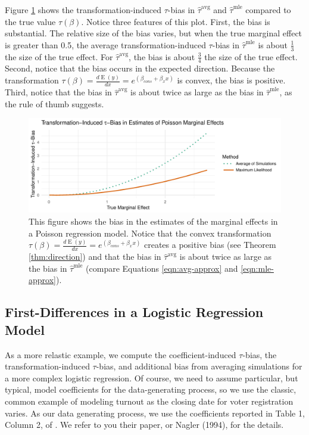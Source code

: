 \documentclass[11pt]{article}
\DeclareMathOperator*{\E}{\text{E}}
\begin{document}
Figure \ref{fig:poisson-mcs} shows the transformation-induced $\tau$-bias in $\hat{\tau}^\text{avg}$ and $\hat{\tau}^\text{mle}$ compared to the true value $\tau(\beta)$.
Notice three features of this plot.
First, the bias is substantial.
The relative size of the bias varies, but when the true marginal effect is greater than 0.5, the average transformation-induced $\tau$-bias in $\hat{\tau}^\text{mle}$ is about $\frac{1}{3}$ the size of the true effect.
For $\hat{\tau}^\text{avg}$, the bias is about $\frac{3}{4}$ the size of the true effect.
Second, notice that the bias occurs in the expected direction.
Because the transformation $\tau(\beta) = \frac{d \E (y)}{dx} = e^{(\beta_{cons} + \beta_x x)}$ is convex, the bias is positive.
Third, notice that the bias in $\hat{\tau}^\text{avg}$ is about twice as large as the bias in $\hat{\tau}^\text{mle}$, as the rule of thumb suggests.

\begin{figure}[h!]
\begin{center}
\includegraphics[scale = 0.65]{figs/poisson-mcs.pdf}
\vspace{.1in}
\caption{This figure shows the bias in the estimates of the marginal effects in a Poisson regression model.
Notice that the convex transformation $\tau(\beta) = \frac{d \E (y)}{dx} = e^{(\beta_{cons} + \beta_x x)}$ creates a positive bias (see Theorem \ref{thm:direction}) and that the bias in $\hat{\tau}^\text{avg}$ is about twice as large as the bias in $\hat{\tau}^\text{mle}$ (compare Equations \ref{eqn:avg-approx} and \ref{eqn:mle-approx}).}\label{fig:poisson-mcs}
\end{center}
\end{figure}

\subsection*{First-Differences in a Logistic Regression Model}

As a more relastic example, we compute the coefficient-induced $\tau$-bias, the transformation-induced $\tau$-bias, and additional bias from averaging simulations for a more complex logistic regression. 
Of course, we need to assume particular, but typical, model coefficients for the data-generating process, so we use the classic, common example of modeling turnout \cite{WolfingerRosenstone1980, Nagler1994, HuangShields2000, BerryDeMerittEsarey2010} as the closing date for voter registration varies.
As our data generating process, we use the coefficients reported in Table 1, Column 2, of \cite{BerryDeMerittEsarey2010}. 
We refer to you their paper, or Nagler (1994), for the details.
\end{document}
